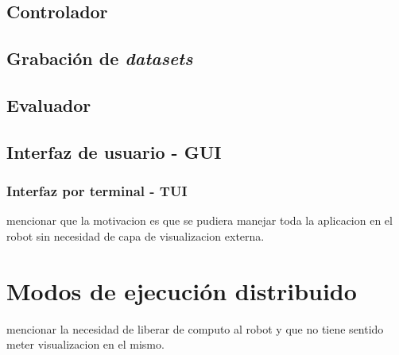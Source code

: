 \subsection{Controlador}
\label{sec:controller}

\subsection{Grabación de \textit{datasets}}


\subsection{Evaluador}


\subsection{Interfaz de usuario - GUI}

\subsubsection{Interfaz por terminal - TUI}
mencionar que la motivacion es que se pudiera manejar toda la aplicacion en el robot sin necesidad de capa de visualizacion externa.

\section{Modos de ejecución distribuido}
\label{sec:headless}

mencionar la necesidad de liberar de computo al robot y que no tiene sentido meter visualizacion en el mismo.